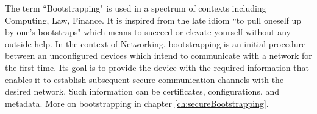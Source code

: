 The term ``Bootstrapping" is used in a spectrum of contexts including Computing, Law, Finance. It is inspired from the late idiom ``to pull oneself up by one's bootstraps" which means to succeed or elevate yourself without any outside help. In the context of Networking, bootstrapping is an initial procedure between an unconfigured devices which intend to communicate with a network for the first time. Its goal is to provide the device with the required information that enables it to establish subsequent secure communication channels with the desired network. Such information can be certificates, configurations, and metadata. More on bootstrapping in chapter \ref{ch:secureBootstrapping}.
